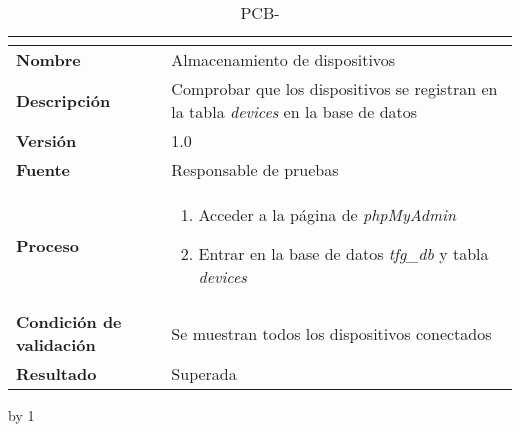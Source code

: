 \begin{table}[H]
	\caption{PCB-\number\pcb}
	\begin{tabular}{|l|p{}|}
		\hline
		\multicolumn{2}{|c|}{\cellcolor[HTML]{BFBFBF}{\color[HTML]{000000} \textbf{PCB-\number\pcb}}} \\ \hline
		\textbf{Nombre}                  & Almacenamiento de dispositivos                                                               \\ \hline
		\textbf{Descripción}             & Comprobar que los dispositivos se registran en la tabla \textit{devices} en la base de datos \\ \hline
		\textbf{Versión}                 & 1.0                                                                                          \\ \hline
		\textbf{Fuente}                  & Responsable de pruebas                                                                       \\ \hline
		\textbf{Proceso}                 & \begin{enumerate}
			\item Acceder a la página de \textit{phpMyAdmin}
			\item Entrar en la base de datos \textit{tfg\_db} y tabla \textit{devices}
		\end{enumerate}                                                                    \\ \hline
		\textbf{Condición de validación} & Se muestran todos los dispositivos conectados                                                \\ \hline
		\textbf{Resultado}               & Superada                                                                                     \\ \hline
	\end{tabular}
\end{table}
\advance\pcb by 1
